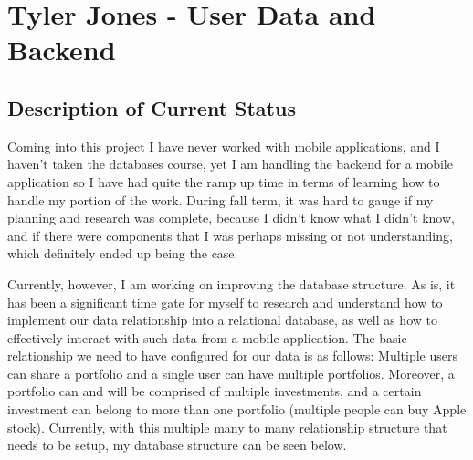 \documentclass[letterpaper,10pt,titlepage,journal,compsoc,draftclsnofoot,onecolumn]{IEEEtran}
\begin{document}
\section{Tyler Jones - User Data and Backend}

\subsection{Description of Current Status}
 Coming into this project I have never worked with mobile applications, and I haven't taken the databases course, yet I am handling the backend for a mobile application so I have had quite the ramp up time in terms of learning how to handle my portion of the work. During fall term, it was hard to gauge if my planning and research was complete, because I didn't know what I didn’t know, and if there were components that I was perhaps missing or not understanding, which definitely ended up being the case. 

Currently, however, I am working on improving the database structure. As is, it has been a significant time gate for myself to research and understand how to implement our data relationship into a relational database, as well as how to effectively interact with such data from a mobile application. The basic relationship we need to have configured for our data is as follows: Multiple users can share a portfolio and a single user can have multiple portfolios. Moreover, a portfolio can and will be comprised of multiple investments, and a certain investment can belong to more than one portfolio (multiple people can buy Apple stock). Currently, with this multiple many to many relationship structure that needs to be setup, my database structure can be seen below.
\end{document}
